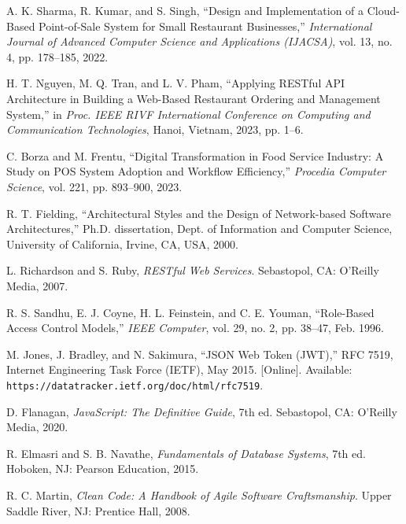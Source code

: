 \documentclass[12pt,a4paper]{report}
\begin{document}
\begin{enumerate}[leftmargin=*, label={[\arabic*]}]

  \item A. K. Sharma, R. Kumar, and S. Singh,
        ``Design and Implementation of a Cloud-Based Point-of-Sale System for Small Restaurant Businesses,''
        \textit{International Journal of Advanced Computer Science and Applications (IJACSA)},
        vol. 13, no. 4, pp. 178--185, 2022.

  \item H. T. Nguyen, M. Q. Tran, and L. V. Pham,
        ``Applying RESTful API Architecture in Building a Web-Based Restaurant Ordering and Management System,''
        in \textit{Proc. IEEE RIVF International Conference on Computing and Communication Technologies},
        Hanoi, Vietnam, 2023, pp. 1--6.

  \item C. Borza and M. Frentu,
        ``Digital Transformation in Food Service Industry: A Study on POS System Adoption and Workflow Efficiency,''
        \textit{Procedia Computer Science}, vol. 221, pp. 893--900, 2023.

  \item R. T. Fielding,
        ``Architectural Styles and the Design of Network-based Software Architectures,''
        Ph.D. dissertation, Dept. of Information and Computer Science,
        University of California, Irvine, CA, USA, 2000.

  \item L. Richardson and S. Ruby,
        \textit{RESTful Web Services}.
        Sebastopol, CA: O'Reilly Media, 2007.

  \item R. S. Sandhu, E. J. Coyne, H. L. Feinstein, and C. E. Youman,
        ``Role-Based Access Control Models,''
        \textit{IEEE Computer}, vol. 29, no. 2, pp. 38--47, Feb. 1996.

  \item M. Jones, J. Bradley, and N. Sakimura,
        ``JSON Web Token (JWT),''
        RFC 7519, Internet Engineering Task Force (IETF), May 2015.
        [Online]. Available: \texttt{https://datatracker.ietf.org/doc/html/rfc7519}.

  \item D. Flanagan,
        \textit{JavaScript: The Definitive Guide}, 7th ed.
        Sebastopol, CA: O'Reilly Media, 2020.

  \item R. Elmasri and S. B. Navathe,
        \textit{Fundamentals of Database Systems}, 7th ed.
        Hoboken, NJ: Pearson Education, 2015.

  \item R. C. Martin,
        \textit{Clean Code: A Handbook of Agile Software Craftsmanship}.
        Upper Saddle River, NJ: Prentice Hall, 2008.

\end{enumerate}
\end{document}
